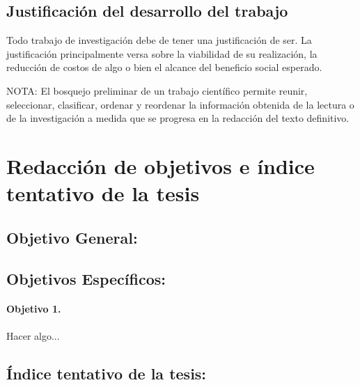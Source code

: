 \documentclass[runningheads,a4paper]{book}
\begin{document}
\subsection{Justificación del desarrollo del trabajo}

Todo trabajo de investigación debe de tener una justificación de ser. La justificación principalmente versa sobre la viabilidad de su realización, la reducción de costos de algo o bien el alcance del beneficio social esperado.\newline

NOTA: El bosquejo preliminar de un trabajo científico permite reunir, seleccionar, clasificar, ordenar y reordenar la información obtenida de la lectura o de la investigación a medida que se progresa en la redacción del texto definitivo.

\section{Redacción de objetivos e índice tentativo de la tesis}
\subsection{Objetivo General:}

\subsection{Objetivos Espec\'ificos:}
\paragraph{Objetivo 1.}
Hacer algo...


\subsection{\'Indice tentativo de la tesis:}
\end{document}
